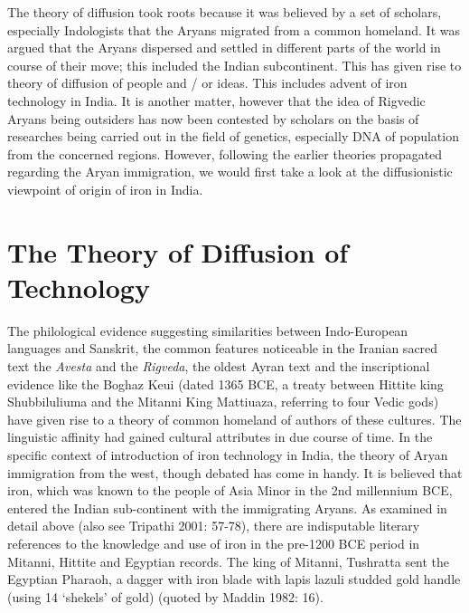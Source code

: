 The theory of diffusion took roots because it was believed by a set of scholars, especially Indologists that the Aryans migrated from a common homeland. It was argued that the Aryans dispersed and settled in different parts of the world in course of their move; this included the Indian subcontinent. This has given rise to theory of diffusion of people and / or ideas. This includes advent of iron technology in India. It is another matter, however that the idea of Rigvedic Aryans being outsiders has now been contested by scholars on the basis of researches being carried out in the field of genetics, especially DNA of population from the concerned regions. However, following the earlier theories propagated regarding the Aryan immigration, we would first take a look at the diffusionistic viewpoint of origin of iron in India.	

\section{The Theory of Diffusion of Technology}\label{section-1}

The philological evidence suggesting similarities between Indo-European languages and Sanskrit, the common features noticeable in the Iranian sacred text the \textit{Avesta} and the \textit{Rigveda}, the oldest Ayran text and the inscriptional evidence like the Boghaz Keui (dated 1365 BCE, a treaty between Hittite king Shubbiluliuma and the Mitanni King Mattiuaza, referring to four Vedic gods) have given rise to a theory of common homeland of authors of these cultures. The linguistic affinity had gained cultural attributes in due course of time. In the specific context of introduction of iron technology in India, the theory of Aryan immigration from the west, though debated has come in handy. It is believed that iron, which was known to the people of Asia Minor in the 2nd millennium BCE, entered the Indian sub-continent with the immigrating Aryans. As examined in detail above (also see Tripathi 2001: 57-78), there are indisputable literary references to the knowledge and use of iron in the pre-1200 BCE period in Mitanni, Hittite and Egyptian records. The king of Mitanni, Tushratta sent the Egyptian Pharaoh, a dagger with iron blade with lapis lazuli studded gold handle (using 14 ‘shekels’ of gold) (quoted by Maddin 1982: 16).

